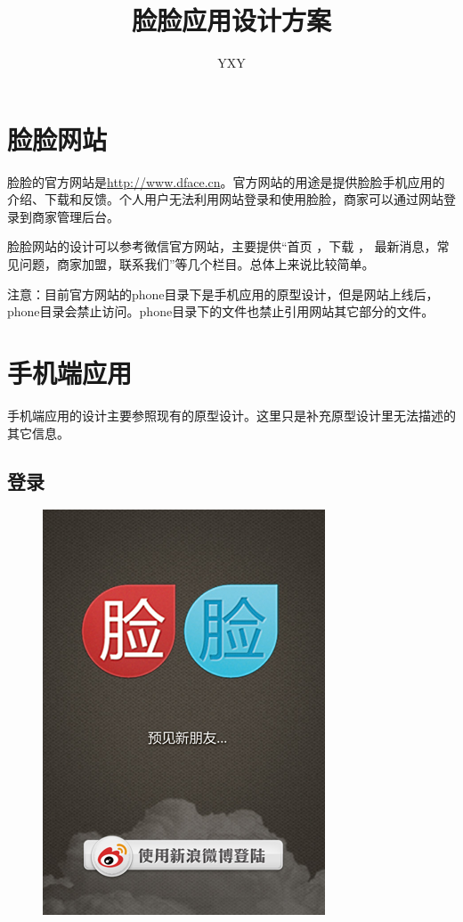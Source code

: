 \documentclass[cs4size]{ctexartutf8}
\author{YXY}
\title{脸脸应用设计方案}
\begin{document}
 

\maketitle
\tableofcontents

\section{脸脸网站}
脸脸的官方网站是\href{http://www.dface.cn}{http://www.dface.cn}。官方网站的用途是提供脸脸手机应用的介绍、下载和反馈。个人用户无法利用网站登录和使用脸脸，商家可以通过网站登录到商家管理后台。


脸脸网站的设计可以参考微信官方网站，主要提供“首页 ，下载 ， 最新消息，常见问题，商家加盟，联系我们”等几个栏目。总体上来说比较简单。


注意：目前官方网站的phone目录下是手机应用的原型设计，但是网站上线后，phone目录会禁止访问。phone目录下的文件也禁止引用网站其它部分的文件。


\section{手机端应用}
手机端应用的设计主要参照现有的原型设计。这里只是补充原型设计里无法描述的其它信息。

\subsection{登录}

\begin{figure}[H]
\centering
\includegraphics[scale=0.5]{./1.png}
\label{p1}
\end{figure}
\end{document}

